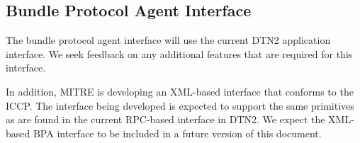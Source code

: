 \subsection{Bundle Protocol Agent Interface}

The bundle protocol agent interface will use the current DTN2 application 
interface.  We seek feedback on any additional features that are required 
for this interface.

In addition, MITRE is developing an XML-based interface that conforms 
to the ICCP.  The interface being developed is expected to support the 
same primitives as are found in the current RPC-based interface in DTN2.  
We expect the XML-based BPA interface to be included in a future version 
of this document.

